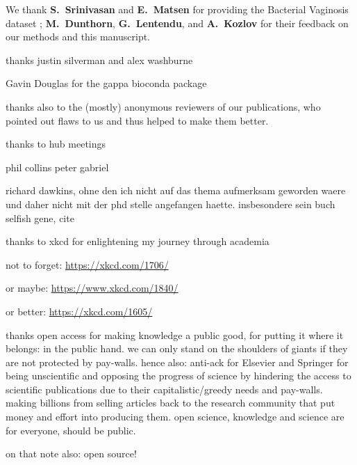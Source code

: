 We thank \textbf{S.~Srinivasan} and \textbf{E.~Matsen}
for providing the Bacterial Vaginosis dataset \citep{Srinivasan2012};
\textbf{M.~Dunthorn}, \textbf{G.~Lentendu}, %
and \textbf{A.~Kozlov}
for their feedback on our methods and this manuscript.

thanks justin silverman and alex washburne

Gavin Douglas for the gappa bioconda package

thanks also to the (mostly) anonymous reviewers of our publications,
who pointed out flaws to us and thus helped to make them better.

thanks to hub meetings

phil collins peter gabriel

richard dawkins, ohne den ich nicht auf das thema aufmerksam geworden waere und daher nicht mit der phd stelle angefangen haette.
insbesondere sein buch selfish gene, cite


\todo{} \cite{Beer2018}

thanks to xkcd for enlightening my journey through academia

not to forget:
\url{https://xkcd.com/1706/}

or maybe:
\url{https://www.xkcd.com/1840/}

or better:
\url{https://xkcd.com/1605/}

thanks open access for making knowledge a public good, for putting it where it belongs: in the public hand.
we can only stand on the shoulders of giants if they are not protected by pay-walls.
hence also:
anti-ack for Elsevier and Springer for being unscientific and opposing the progress of science
by hindering the access to scientific publications due to their capitalistic/greedy needs and pay-walls.
making billions from selling articles back to the research community that put money and effort into producing them.
open science, knowledge and science are for everyone, should be public.

on that note also: open source!

